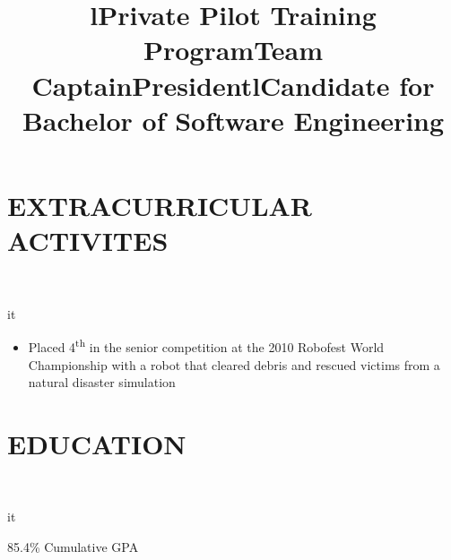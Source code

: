 \documentclass[]{res}
\begin{document}
\begin{resume}
\section{EXTRACURRICULAR ACTIVITES}
  \begin{format}  \\ \title{l}{it} \\ \body \end{format}
  \title{Private Pilot Training Program}
  \begin{position}
    \hspace{-100pt}
  \end{position}
  \title{Team Captain}
  \begin{position}
    \begin{itemize}
      \item Placed 4\textsuperscript{th} in the senior competition at the 2010 Robofest World Championship with a robot that
        cleared debris and rescued victims from a natural disaster simulation
    \end{itemize}
  \end{position}
  \title{President}
  \begin{position}
    \hspace{-100pt}
  \end{position}

\section{EDUCATION}
  \begin{format}  \\ \title{l}{it} \\ \body \end{format}
  \title{Candidate for Bachelor of Software Engineering}
  \begin{position}
    85.4\% Cumulative GPA
  \end{position}
 
\end{resume}
\end{document}
